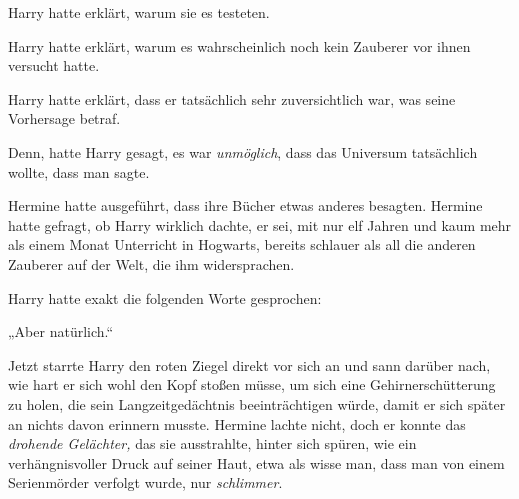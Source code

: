 Harry hatte erklärt, warum sie es testeten.

Harry hatte erklärt, warum es wahrscheinlich noch kein Zauberer vor ihnen versucht hatte.

Harry hatte erklärt, dass er tatsächlich sehr zuversichtlich war, was seine Vorhersage betraf.

Denn, hatte Harry gesagt, es war \emph{unmöglich}, dass das Universum tatsächlich wollte, dass man  sagte.

Hermine hatte ausgeführt, dass ihre Bücher etwas anderes besagten. Hermine hatte gefragt, ob Harry wirklich dachte, er sei, mit nur elf Jahren und kaum mehr als einem Monat Unterricht in Hogwarts, bereits schlauer als all die anderen Zauberer auf der Welt, die ihm widersprachen.

Harry hatte exakt die folgenden Worte gesprochen:

„Aber natürlich.“

Jetzt starrte Harry den roten Ziegel direkt vor sich an und sann darüber nach, wie hart er sich wohl den Kopf stoßen müsse, um sich eine Gehirnerschütterung zu holen, die sein Langzeitgedächtnis beeinträchtigen würde, damit er sich später an nichts davon erinnern musste. Hermine lachte nicht, doch er konnte das \emph{drohende Gelächter,} das sie ausstrahlte, hinter sich spüren, wie ein verhängnisvoller Druck auf seiner Haut, etwa als wisse man, dass man von einem Serienmörder verfolgt wurde, nur \emph{schlimmer}.

